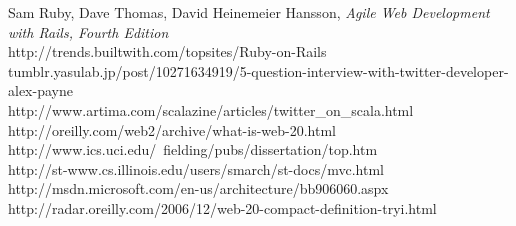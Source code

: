 \begin{thebibliography}{99}
   Sam Ruby, Dave Thomas, David Heinemeier Hansson, \emph{Agile Web Development with Rails, Fourth Edition}\\
    http://trends.builtwith.com/topsites/Ruby-on-Rails\\
   tumblr.yasulab.jp/post/10271634919/5-question-interview-with-twitter-developer-alex-payne\\
   http://www.artima.com/scalazine/articles/twitter\_on\_scala.html\\
   http://oreilly.com/web2/archive/what-is-web-20.html\\
   http://www.ics.uci.edu/~fielding/pubs/dissertation/top.htm\\
   http://st-www.cs.illinois.edu/users/smarch/st-docs/mvc.html\\
   http://msdn.microsoft.com/en-us/architecture/bb906060.aspx\\
   http://radar.oreilly.com/2006/12/web-20-compact-definition-tryi.html\\

\end{thebibliography}




